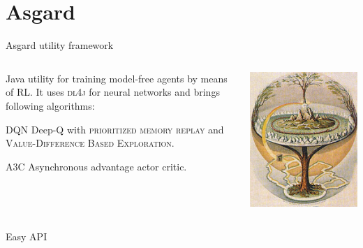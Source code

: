 \documentclass[aspectratio=169]{beamer}
\begin{document}
\section{Asgard}
\begin{frame}{Asgard utility framework}
	\begin{columns}
		\begin{column}{0.8\textwidth}
		Java utility for training model-free agents by means of \textsc{RL}. It uses \textsc{dl4j} for neural networks and brings following algorithms:
		\begin{alertblock}{DQN}
			Deep-Q with \textsc{prioritized memory replay} and \textsc{Value-Difference Based Exploration}. 
		\end{alertblock}
		\begin{alertblock}{A3C}
			Asynchronous advantage actor critic.
		\end{alertblock}		
		\end{column}
		\begin{column}{0.2\textwidth}
			\includegraphics[scale=0.4]{img/asgard.jpg}
		\end{column}
	\end{columns}
	
\end{frame}

\begin{frame}{Easy API}

\end{frame}
\end{document}
